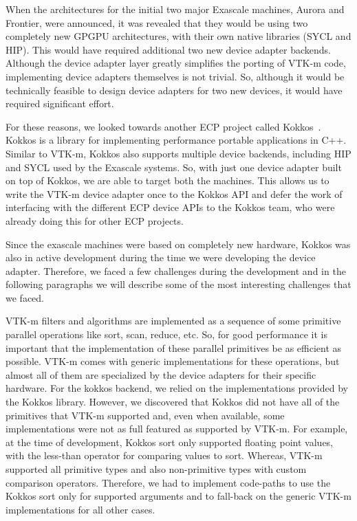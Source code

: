 When the architectures for the initial two major Exascale machines, Aurora and Frontier, were announced, it was revealed that they would be using two completely new GPGPU architectures, with their own native libraries (SYCL and HIP).
This would have required additional two new device adapter backends.
Although the device adapter layer greatly simplifies the porting of VTK-m code, implementing device adapters themselves is not trivial.
So, although it would be technically feasible to design device adapters for two new devices, it would have required significant effort.

For these reasons, we looked towards another ECP project called Kokkos~\cite{Edwards2014, Trott2022}. Kokkos is a library for implementing performance portable applications in C++. Similar to VTK-m, Kokkos also supports multiple device backends, including HIP and SYCL used by the Exascale systems. So, with just one device adapter built on top of Kokkos, we are able to target both the machines.
This allows us to write the VTK-m device adapter once to the Kokkos API and defer the work of interfacing with the different ECP device APIs to the Kokkos team, who were already doing this for other ECP projects.

Since the exascale machines were based on completely new hardware, Kokkos was also in active development during the time we were developing the device adapter. Therefore, we faced a few challenges during the development and in the following paragraphs we will describe some of the most interesting challenges that we faced.

VTK-m filters and algorithms are implemented as a sequence of some primitive parallel operations like sort, scan, reduce, etc. So, for good performance it is important that the implementation of these parallel primitives be as efficient as possible. VTK-m comes with generic implementations for these operations, but almost all of them are specialized by the device adapters for their specific hardware. For the kokkos backend, we relied on the implementations provided by the Kokkos library. However, we discovered that Kokkos did not have all of the primitives that VTK-m supported and, even when available, some implementations were not as full featured as supported by VTK-m. For example, at the time of development, Kokkos sort only supported floating point values, with the less-than operator for comparing values to sort. Whereas, VTK-m supported all primitive types and also non-primitive types with custom comparison operators. Therefore, we had to implement code-paths to use the Kokkos sort only for supported arguments and to fall-back on the generic VTK-m implementations for all other cases.

